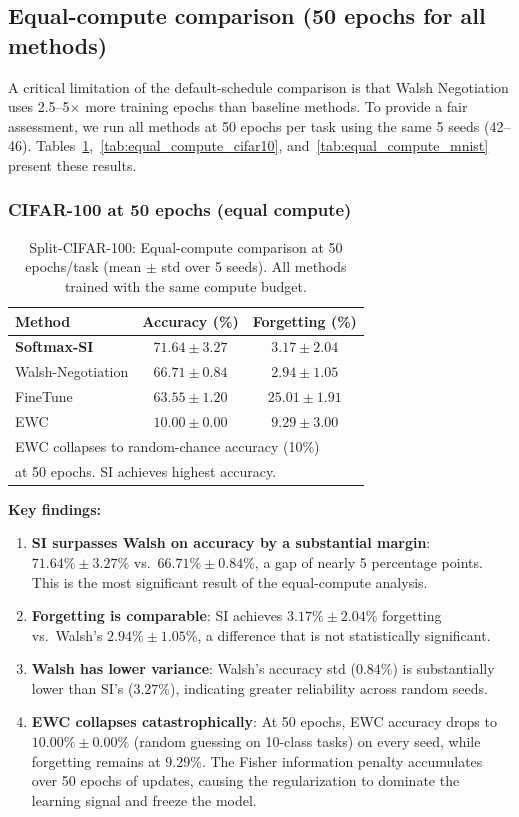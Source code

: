 \documentclass[preprint,review,12pt]{elsarticle}
\begin{document}
\subsection{Equal-compute comparison (50 epochs for all methods)}
\label{sec:equal_compute}

A critical limitation of the default-schedule comparison is that Walsh Negotiation uses 2.5--5$\times$ more training epochs than baseline methods. To provide a fair assessment, we run all methods at 50 epochs per task using the same 5 seeds (42--46). Tables~\ref{tab:equal_compute_cifar100},~\ref{tab:equal_compute_cifar10}, and~\ref{tab:equal_compute_mnist} present these results.

\subsubsection{CIFAR-100 at 50 epochs (equal compute)}

\begin{table}[t]
\centering
\caption{Split-CIFAR-100: Equal-compute comparison at 50 epochs/task (mean $\pm$ std over 5 seeds). All methods trained with the same compute budget.}
\label{tab:equal_compute_cifar100}
\begin{tabular}{lcc}
\toprule
Method & Accuracy (\%) & Forgetting (\%) \\
\midrule
\textbf{Softmax-SI} & $\mathbf{71.64 \pm 3.27}$ & $3.17 \pm 2.04$ \\
Walsh-Negotiation & $66.71 \pm 0.84$ & $\mathbf{2.94 \pm 1.05}$ \\
FineTune & $63.55 \pm 1.20$ & $25.01 \pm 1.91$ \\
EWC & $10.00 \pm 0.00$ & $9.29 \pm 3.00$ \\
\bottomrule
\multicolumn{3}{l}{\scriptsize EWC collapses to random-chance accuracy (10\%)} \\
\multicolumn{3}{l}{\scriptsize at 50 epochs. SI achieves highest accuracy.}
\end{tabular}
\end{table}

\textbf{Key findings:}
\begin{enumerate}
\item \textbf{SI surpasses Walsh on accuracy by a substantial margin}: $71.64\% \pm 3.27\%$ vs.\ $66.71\% \pm 0.84\%$, a gap of nearly 5 percentage points. This is the most significant result of the equal-compute analysis.
\item \textbf{Forgetting is comparable}: SI achieves $3.17\% \pm 2.04\%$ forgetting vs.\ Walsh's $2.94\% \pm 1.05\%$, a difference that is not statistically significant.
\item \textbf{Walsh has lower variance}: Walsh's accuracy std ($0.84\%$) is substantially lower than SI's ($3.27\%$), indicating greater reliability across random seeds.
\item \textbf{EWC collapses catastrophically}: At 50 epochs, EWC accuracy drops to $10.00\% \pm 0.00\%$ (random guessing on 10-class tasks) on every seed, while forgetting remains at $9.29\%$. The Fisher information penalty accumulates over 50 epochs of updates, causing the regularization to dominate the learning signal and freeze the model.
\end{enumerate}
\end{document}
